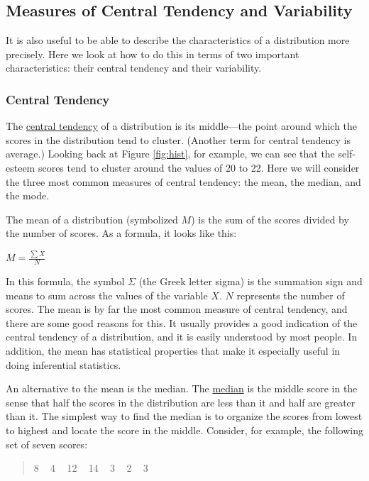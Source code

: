 \documentclass[
]{krantz}
\begin{document}
\subsection*{Measures of Central Tendency and Variability}\label{measures-of-central-tendency-and-variability}


It is also useful to be able to describe the characteristics of a distribution more precisely. Here we look at how to do this in terms of two important characteristics: their central tendency and their variability.

\subsubsection*{Central Tendency}\label{central-tendency}


The \hyperref[central-tendency]{central tendency} of a distribution is its middle---the point around which the scores in the distribution tend to cluster. (Another term for central tendency is average.) Looking back at Figure \ref{fig:hist}, for example, we can see that the self-esteem scores tend to cluster around the values of 20 to 22. Here we will consider the three most common measures of central tendency: the mean, the median, and the mode.

The mean of a distribution (symbolized \(M\)) is the sum of the scores divided by the number of scores. As a formula, it looks like this:

\(M = \frac{\sum X}{N}\)

In this formula, the symbol \(Σ\) (the Greek letter sigma) is the summation sign and means to sum across the values of the variable \(X\). \(N\) represents the number of scores. The mean is by far the most common measure of central tendency, and there are some good reasons for this. It usually provides a good indication of the central tendency of a distribution, and it is easily understood by most people. In addition, the mean has statistical properties that make it especially useful in doing inferential statistics.

An alternative to the mean is the median. The \hyperref[median]{median} is the middle score in the sense that half the scores in the distribution are less than it and half are greater than it. The simplest way to find the median is to organize the scores from lowest to highest and locate the score in the middle. Consider, for example, the following set of seven scores:

\begin{quote}
8 ~ 4 ~ 12 ~ 14 ~ 3 ~ 2 ~ 3
\end{quote}
\end{document}
